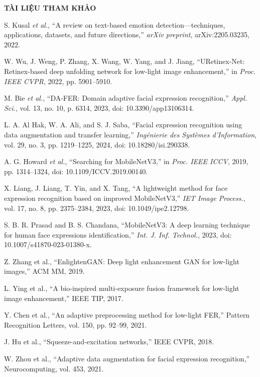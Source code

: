{\LARGE \textbf{TÀI LIỆU THAM KHẢO}} \\[1cm] %

\begin{enumerate}[label={[{\arabic*}]}]
    \item S. Kusal \textit{et al.}, “A review on text-based emotion detection—techniques, applications, datasets, and future directions,” \textit{arXiv preprint}, arXiv:2205.03235, 2022.

    \item W. Wu, J. Weng, P. Zhang, X. Wang, W. Yang, and J. Jiang, “URetinex-Net: Retinex-based deep unfolding network for low-light image enhancement,” in \textit{Proc. IEEE CVPR}, 2022, pp. 5901–5910.

    \item M. Bie \textit{et al.}, “DA-FER: Domain adaptive facial expression recognition,” \textit{Appl. Sci.}, vol. 13, no. 10, p. 6314, 2023, doi: 10.3390/app13106314.

    \item L. A. Al Hak, W. A. Ali, and S. J. Saba, “Facial expression recognition using data augmentation and transfer learning,” \textit{Ingénierie des Systèmes d'Information}, vol. 29, no. 3, pp. 1219–1225, 2024, doi: 10.18280/isi.290338.

    \item A. G. Howard \textit{et al.}, “Searching for MobileNetV3,” in \textit{Proc. IEEE ICCV}, 2019, pp. 1314–1324, doi: 10.1109/ICCV.2019.00140.

    \item X. Liang, J. Liang, T. Yin, and X. Tang, “A lightweight method for face expression recognition based on improved MobileNetV3,” \textit{IET Image Process.}, vol. 17, no. 8, pp. 2375–2384, 2023, doi: 10.1049/ipe2.12798.

    \item S. B. R. Prasad and B. S. Chandana, “MobileNetV3: A deep learning technique for human face expressions identification,” \textit{Int. J. Inf. Technol.}, 2023, doi: 10.1007/s41870-023-01380-x.
    
    \item Z. Zhang et al., “EnlightenGAN: Deep light enhancement GAN for low-light images,” ACM MM, 2019.

    \item L. Ying et al., “A bio-inspired multi-exposure fusion framework for low-light image enhancement,” IEEE TIP, 2017.
    
    \item Y. Chen et al., “An adaptive preprocessing method for low-light FER,” Pattern Recognition Letters, vol. 150, pp. 92–99, 2021.
    
    \item J. Hu et al., “Squeeze-and-excitation networks,” IEEE CVPR, 2018.
    
    \item  W. Zhou et al., “Adaptive data augmentation for facial expression recognition,” Neurocomputing, vol. 453, 2021.

\end{enumerate}